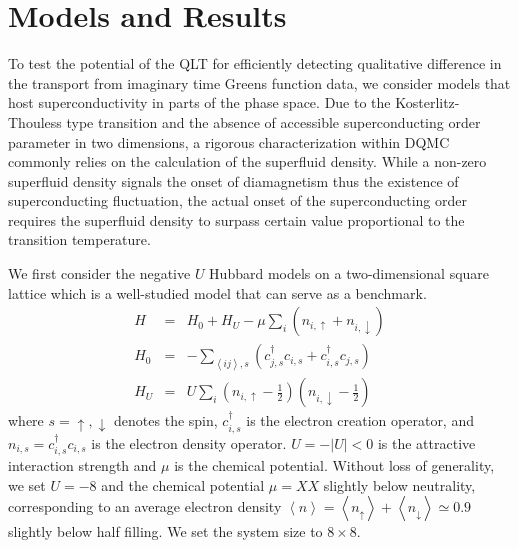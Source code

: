 \documentclass[amsmath,amssymb, aps, prl, twocolumn]{revtex4-1}
\begin{document}
\section{Models and Results}
To test the potential of the QLT for efficiently detecting qualitative difference in the transport from imaginary time Greens function data, we consider models that host superconductivity in parts of the phase space. {\color{blue}Due to the Kosterlitz-Thouless type transition and the absence of accessible superconducting order parameter in two dimensions, a rigorous characterization within DQMC commonly relies on the calculation of the superfluid density\cite{Scalapino1993, Scalapino1992, Nandini1996}. While a non-zero superfluid density signals the onset of diamagnetism thus the existence of superconducting fluctuation\cite{Erez2016}, the actual onset of the superconducting order requires the superfluid density to surpass certain value proportional to the transition temperature\cite{KT1973}.}

We first consider the negative $U$ Hubbard models on a two-dimensional square lattice\cite{Scalettar1989, Scalapino1992} which is a well-studied model that can serve as a benchmark. 
\begin{eqnarray}
H &=& H_0 + H_U -  \mu\underset{i}{\sum} \left(n_{i,\uparrow} +n_{i,\downarrow}\right) \nonumber\\
H_0 &=& -\underset{\left\langle ij \right\rangle, s}{\sum} \left( c^\dagger_{j,s}c_{i,s} +  c^\dagger_{i,s}c_{j,s} \right) \nonumber \\
H_U &=& U \underset{i}{\sum} \left(n_{i,\uparrow}-\frac{1}{2}\right) \left(n_{i,\downarrow}-\frac{1}{2}\right)
\label{eq:hubbard}
\end{eqnarray}
where $s = \uparrow, \downarrow$ denotes the spin, $c^\dagger_{i,s}$ is the electron creation operator, and $n_{i,s}=c^\dagger_{i,s}c_{i,s}$ is the electron density operator. $U=-\left|U\right|<0$ is the attractive interaction strength and $\mu$ is the chemical potential. Without loss of generality, we set $U=-8$ and the chemical potential $\mu=XX$ slightly below neutrality, corresponding to an average electron density $\left\langle n\right\rangle = \left\langle n_\uparrow\right\rangle+ \left\langle n_\downarrow\right\rangle  \simeq 0.9$ slightly below half filling. We set the system size to $8\times 8$. 
\end{document}
